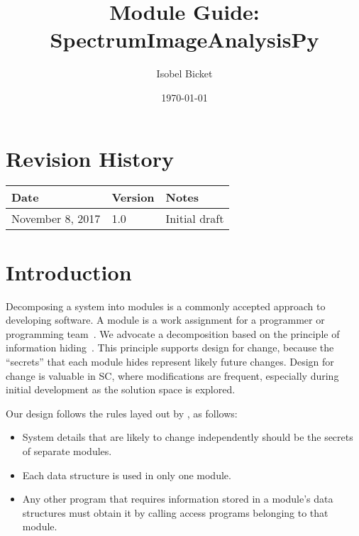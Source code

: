 \documentclass[12pt, titlepage]{article}
\newcommand{\progname}{SpectrumImageAnalysisPy}
\begin{document}
\title{Module Guide: \progname} 
\author{Isobel Bicket}
\date{\today}

\maketitle


\section{Revision History}

\begin{tabularx}{\textwidth}{p{4cm}p{2cm}X}
\toprule {\bf Date} & {\bf Version} & {\bf Notes}\\
\midrule
November 8, 2017 & 1.0 & Initial draft\\
\bottomrule
\end{tabularx}

\newpage

\tableofcontents

\listoftables

\listoffigures

\newpage


\section{Introduction}

Decomposing a system into modules is a commonly accepted approach to developing
software.  A module is a work assignment for a programmer or programming
team~\citep{ParnasEtAl1984}.  We advocate a decomposition
based on the principle of information hiding~\citep{Parnas1972a}.  This
principle supports design for change, because the ``secrets'' that each module
hides represent likely future changes.  Design for change is valuable in SC,
where modifications are frequent, especially during initial development as the
solution space is explored.  

Our design follows the rules layed out by \citet{ParnasEtAl1984}, as follows:
\begin{itemize}
\item System details that are likely to change independently should be the
  secrets of separate modules.
\item Each data structure is used in only one module.
\item Any other program that requires information stored in a module's data
  structures must obtain it by calling access programs belonging to that module.
\end{itemize}
\end{document}
